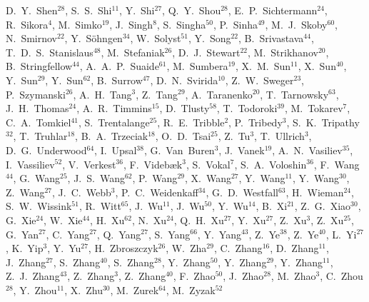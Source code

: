 {D.~Y.~Shen$^{28}$,
S.~S.~Shi$^{11}$,
Y.~Shi$^{27}$,
Q.~Y.~Shou$^{28}$,
E.~P.~Sichtermann$^{24}$,
R.~Sikora$^{4}$,
M.~Simko$^{19}$,
J.~Singh$^{8}$,
S.~Singha$^{50}$,
P.~Sinha$^{49}$,
M.~J.~Skoby$^{60}$,
N.~Smirnov$^{22}$,
Y.~S\"{o}hngen$^{34}$,
W.~Solyst$^{51}$,
Y.~Song$^{22}$,
B.~Srivastava$^{44}$,
T.~D.~S.~Stanislaus$^{48}$,
M.~Stefaniak$^{26}$,
D.~J.~Stewart$^{22}$,
M.~Strikhanov$^{20}$,
B.~Stringfellow$^{44}$,
A.~A.~P.~Suaide$^{61}$,
M.~Sumbera$^{19}$,
X.~M.~Sun$^{11}$,
X.~Sun$^{40}$,
Y.~Sun$^{29}$,
Y.~Sun$^{62}$,
B.~Surrow$^{47}$,
D.~N.~Svirida$^{10}$,
Z.~W.~Sweger$^{23}$,
P.~Szymanski$^{26}$,
A.~H.~Tang$^{3}$,
Z.~Tang$^{29}$,
A.~Taranenko$^{20}$,
T.~Tarnowsky$^{63}$,
J.~H.~Thomas$^{24}$,
A.~R.~Timmins$^{15}$,
D.~Tlusty$^{58}$,
T.~Todoroki$^{39}$,
M.~Tokarev$^{7}$,
C.~A.~Tomkiel$^{41}$,
S.~Trentalange$^{25}$,
R.~E.~Tribble$^{2}$,
P.~Tribedy$^{3}$,
S.~K.~Tripathy$^{32}$,
T.~Truhlar$^{18}$,
B.~A.~Trzeciak$^{18}$,
O.~D.~Tsai$^{25}$,
Z.~Tu$^{3}$,
T.~Ullrich$^{3}$,
D.~G.~Underwood$^{64}$,
I.~Upsal$^{38}$,
G.~Van~Buren$^{3}$,
J.~Vanek$^{19}$,
A.~N.~Vasiliev$^{35}$,
I.~Vassiliev$^{52}$,
V.~Verkest$^{36}$,
F.~Videb{\ae}k$^{3}$,
S.~Vokal$^{7}$,
S.~A.~Voloshin$^{36}$,
F.~Wang$^{44}$,
G.~Wang$^{25}$,
J.~S.~Wang$^{62}$,
P.~Wang$^{29}$,
X.~Wang$^{27}$,
Y.~Wang$^{11}$,
Y.~Wang$^{30}$,
Z.~Wang$^{27}$,
J.~C.~Webb$^{3}$,
P.~C.~Weidenkaff$^{34}$,
G.~D.~Westfall$^{63}$,
H.~Wieman$^{24}$,
S.~W.~Wissink$^{51}$,
R.~Witt$^{65}$,
J.~Wu$^{11}$,
J.~Wu$^{50}$,
Y.~Wu$^{14}$,
B.~Xi$^{21}$,
Z.~G.~Xiao$^{30}$,
G.~Xie$^{24}$,
W.~Xie$^{44}$,
H.~Xu$^{62}$,
N.~Xu$^{24}$,
Q.~H.~Xu$^{27}$,
Y.~Xu$^{27}$,
Z.~Xu$^{3}$,
Z.~Xu$^{25}$,
G.~Yan$^{27}$,
C.~Yang$^{27}$,
Q.~Yang$^{27}$,
S.~Yang$^{66}$,
Y.~Yang$^{43}$,
Z.~Ye$^{38}$,
Z.~Ye$^{40}$,
L.~Yi$^{27}$,
K.~Yip$^{3}$,
Y.~Yu$^{27}$,
H.~Zbroszczyk$^{26}$,
W.~Zha$^{29}$,
C.~Zhang$^{16}$,
D.~Zhang$^{11}$,
J.~Zhang$^{27}$,
S.~Zhang$^{40}$,
S.~Zhang$^{28}$,
Y.~Zhang$^{50}$,
Y.~Zhang$^{29}$,
Y.~Zhang$^{11}$,
Z.~J.~Zhang$^{43}$,
Z.~Zhang$^{3}$,
Z.~Zhang$^{40}$,
F.~Zhao$^{50}$,
J.~Zhao$^{28}$,
M.~Zhao$^{3}$,
C.~Zhou$^{28}$,
Y.~Zhou$^{11}$,
X.~Zhu$^{30}$,
M.~Zurek$^{64}$,
M.~Zyzak$^{52}$
}

\address{\rm{(STAR Collaboration)}}

